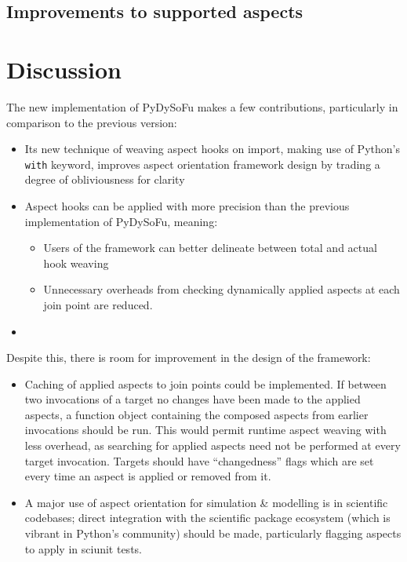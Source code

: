\subsection{Improvements to supported aspects}


\section{Discussion}

The new implementation of PyDySoFu makes a few contributions, particularly in
comparison to the previous version:

\begin{itemize}
    \item Its new technique of weaving aspect hooks on import, making use of
    Python's \lstinline{with} keyword, improves aspect orientation framework
    design by trading a degree of obliviousness for clarity
    \item Aspect hooks can be applied with more precision than the previous
    implementation of PyDySoFu, meaning:
        \begin{itemize}
        \item Users of the framework can better delineate between total and
        actual hook weaving
        \item Unnecessary overheads from checking dynamically applied aspects at
        each join point are reduced.
        \end{itemize}
    \item 
\end{itemize}

Despite this, there is room for improvement in the design of the framework:

\begin{itemize}
    \item Caching of applied aspects to join points could be implemented. If
    between two invocations of a target no changes have been made to the applied
    aspects, a function object containing the composed aspects from earlier
    invocations should be run. This would permit runtime aspect weaving with
    less overhead, as searching for applied aspects need not be performed at
    every target invocation. Targets should have ``changedness'' flags which are
    set every time an aspect is applied or removed from it.
    \item A major use of aspect orientation for simulation \& modelling is in
    scientific codebases; direct integration with the scientific package
    ecosystem (which is vibrant in Python's community) should be made,
    particularly flagging aspects to apply in sciunit
    tests\cite{sciunit_primer}.
\end{itemize}

